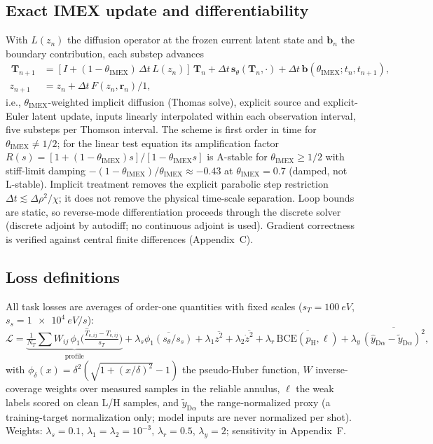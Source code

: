 \documentclass[11pt]{article}
\newcommand{\lat}{z}
\newcommand{\inr}{\bm{r}}
\newcommand{\yD}{y_{\mathrm{D}\alpha}}
\newcommand{\pH}{p_{\mathrm{H}}}
\newcommand{\thIMEX}{\theta_{\mathrm{IMEX}}}
\begin{document}
\subsection{Exact IMEX update and differentiability}
With $L(\lat_n)$ the diffusion operator at the frozen current latent state
and $\bm{b}_n$ the boundary contribution, each substep advances
\begin{align}
[I - \thIMEX\,\Delta t\, L(\lat_n)]\, \bm{T}_{n+1}
&= [I + (1-\thIMEX)\,\Delta t\, L(\lat_n)]\, \bm{T}_n
 + \Delta t\, \bm{s}_\theta(\bm{T}_n, \cdot)
 + \Delta t\, \bm{b}(\thIMEX; t_n, t_{n+1}),
\label{eq:imex-T}\\
\lat_{n+1} &= \lat_n + \Delta t\, F(\lat_n, \inr_n)/1,
\label{eq:imex-z}
\end{align}
i.e., $\thIMEX$-weighted implicit diffusion (Thomas solve), explicit
source and explicit-Euler latent update, inputs linearly interpolated
within each observation interval, five substeps per Thomson interval.
The scheme is first order in time for $\thIMEX \neq 1/2$; for the linear
test equation its amplification factor
$R(s) = [1 + (1-\thIMEX)s]/[1 - \thIMEX s]$ is A-stable for
$\thIMEX \geq 1/2$ with stiff-limit damping
$-(1-\thIMEX)/\thIMEX \approx -0.43$ at $\thIMEX = 0.7$ (damped, not
L-stable). Implicit treatment removes the explicit parabolic step
restriction $\Delta t \lesssim \Delta\rho^2/\chi$; it does not remove the
physical time-scale separation. Loop bounds are static, so reverse-mode
differentiation proceeds through the discrete solver (discrete adjoint by
autodiff; no continuous adjoint is used). Gradient correctness is
verified against central finite differences (Appendix~C).

\subsection{Loss definitions}
All task losses are averages of order-one quantities with fixed scales
($s_T = \SI{100}{eV}$, $s_s = \SI{1e4}{eV/s}$):
\begin{equation}
\mathcal{L} =
\underbrace{\tfrac{1}{N_T}\textstyle\sum W_{ij}\,
\phi_1\!\big(\tfrac{\hat T_{\mathrm{e},ij} - T_{\mathrm{e},ij}}{s_T}\big)}_{\text{profile}}
+ \lambda_s \overline{\phi_1(s_\theta / s_s)}
+ \lambda_1 \overline{\lat^2} + \lambda_2 \overline{\dot\lat^2}
+ \lambda_r\, \overline{\mathrm{BCE}(\pH, \ell)}
+ \lambda_y\, \overline{(\hat\yD - \tilde\yD)^2},
\label{eq:loss}
\end{equation}
with $\phi_\delta(x) = \delta^2(\sqrt{1 + (x/\delta)^2} - 1)$ the
pseudo-Huber function, $W$ inverse-coverage weights over measured samples
in the reliable annulus, $\ell$ the weak labels scored on clean L/H
samples, and $\tilde\yD$ the range-normalized proxy (a training-target
normalization only; model inputs are never normalized per shot).
Weights: $\lambda_s = 0.1$, $\lambda_1 = \lambda_2 = 10^{-3}$,
$\lambda_r = 0.5$, $\lambda_y = 2$; sensitivity in Appendix~F.
\end{document}

